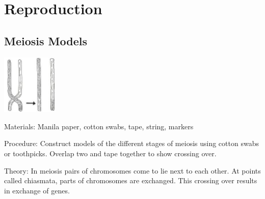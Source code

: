 \section{Reproduction} 

\begin{multicols}{2}


\subsection{Meiosis Models} %

\begin{center}
\includegraphics[width=0.2\textwidth]{./img/vso/cross-over.jpg}
\end{center}

\begin{description*}
\item[Materials:]{Manila paper, cotton swabs, tape, string, markers}
\item[Procedure:]{Construct models of the different stages of meiosis using cotton swabs or toothpicks. Overlap two and tape together to show crossing over.}
\item[Theory:]{In
meiosis pairs of chromosomes
come to lie next to each other. At
points called chiasmata, parts of
chromosomes are exchanged. This
crossing over results in exchange
of genes.}
\end{description*}


\end{multicols}
